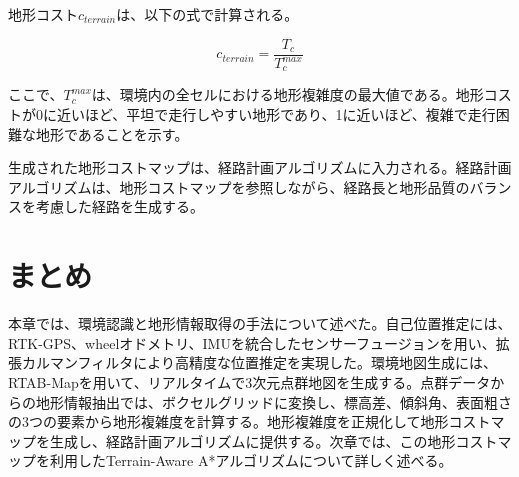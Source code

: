 地形コスト$c_{terrain}$は、以下の式で計算される。

\begin{equation}
c_{terrain} = \frac{T_c}{T_c^{max}}
\label{eq:3_terrain_cost}
\end{equation}

ここで、$T_c^{max}$は、環境内の全セルにおける地形複雑度の最大値である。地形コストが0に近いほど、平坦で走行しやすい地形であり、1に近いほど、複雑で走行困難な地形であることを示す。

生成された地形コストマップは、経路計画アルゴリズムに入力される。経路計画アルゴリズムは、地形コストマップを参照しながら、経路長と地形品質のバランスを考慮した経路を生成する。

\section{まとめ}

本章では、環境認識と地形情報取得の手法について述べた。自己位置推定には、RTK-GPS、wheelオドメトリ、IMUを統合したセンサーフュージョンを用い、拡張カルマンフィルタにより高精度な位置推定を実現した。環境地図生成には、RTAB-Mapを用いて、リアルタイムで3次元点群地図を生成する。点群データからの地形情報抽出では、ボクセルグリッドに変換し、標高差、傾斜角、表面粗さの3つの要素から地形複雑度を計算する。地形複雑度を正規化して地形コストマップを生成し、経路計画アルゴリズムに提供する。次章では、この地形コストマップを利用したTerrain-Aware A*アルゴリズムについて詳しく述べる。
